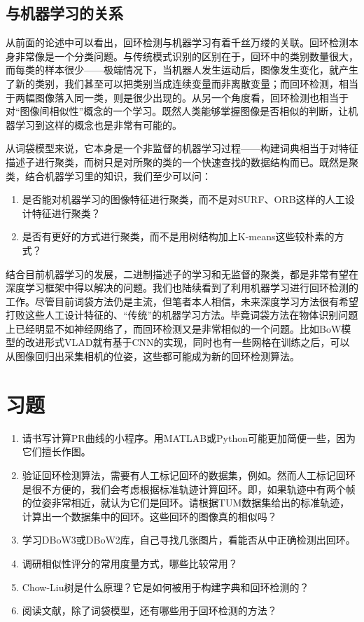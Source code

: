 \subsection{与机器学习的关系}
从前面的论述中可以看出，回环检测与机器学习有着千丝万缕的关联。回环检测本身非常像是一个分类问题。与传统模式识别的区别在于，回环中的类别数量很大，而每类的样本很少——极端情况下，当机器人发生运动后，图像发生变化，就产生了新的类别，我们甚至可以把类别当成连续变量而非离散变量；而回环检测，相当于两幅图像落入同一类，则是很少出现的。从另一个角度看，回环检测也相当于对“图像间相似性”概念的一个学习。既然人类能够掌握图像是否相似的判断，让机器学习到这样的概念也是非常有可能的。

从词袋模型来说，它本身是一个非监督的机器学习过程——构建词典相当于对特征描述子进行聚类，而树只是对所聚的类的一个快速查找的数据结构而已。既然是聚类，结合机器学习里的知识，我们至少可以问：

\begin{enumerate}
	\item 是否能对机器学习的图像特征进行聚类，而不是对SURF、ORB这样的人工设计特征进行聚类？
	\item 是否有更好的方式进行聚类，而不是用树结构加上K-means这些较朴素的方式？
\end{enumerate}

结合目前机器学习的发展，二进制描述子的学习和无监督的聚类，都是非常有望在深度学习框架中得以解决的问题。我们也陆续看到了利用机器学习进行回环检测的工作。尽管目前词袋方法仍是主流，但笔者本人相信，未来深度学习方法很有希望打败这些人工设计特征的、“传统”的机器学习方法\textsuperscript{\cite{Gao2015, Gao2015b}}。毕竟词袋方法在物体识别问题上已经明显不如神经网络了，而回环检测又是非常相似的一个问题。比如BoW模型的改进形式VLAD就有基于CNN的实现\cite{Arandjelovic2016,AngelinaUy2018}，同时也有一些网格在训练之后，可以从图像回归出采集相机的位姿\cite{Kendall2015}，这些都可能成为新的回环检测算法。

\section*{习题}
\begin{enumerate}
	\item 请书写计算PR曲线的小程序。用MATLAB或Python可能更加简便一些，因为它们擅长作图。
	\item 验证回环检测算法，需要有人工标记回环的数据集，例如\cite{Cummins2008}。然而人工标记回环是很不方便的，我们会考虑根据标准轨迹计算回环。即，如果轨迹中有两个帧的位姿非常相近，就认为它们是回环。请根据TUM数据集给出的标准轨迹，计算出一个数据集中的回环。这些回环的图像真的相似吗？
	\item 学习DBoW3或DBoW2库，自己寻找几张图片，看能否从中正确检测出回环。
	\item 调研相似性评分的常用度量方式，哪些比较常用？
	\item Chow-Liu树是什么原理？它是如何被用于构建字典和回环检测的？
	\item 阅读文献\cite{Williams2009}，除了词袋模型，还有哪些用于回环检测的方法？
\end{enumerate}
